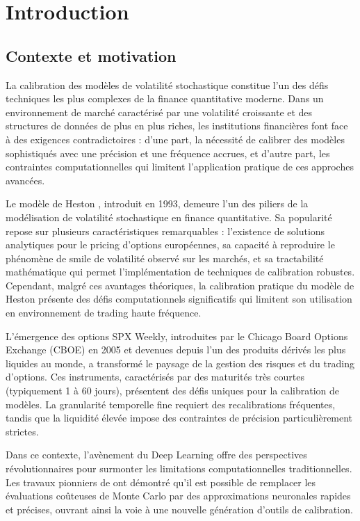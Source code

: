\chapter{Introduction}

\section{Contexte et motivation}

La calibration des modèles de volatilité stochastique constitue l'un des défis techniques les plus complexes de la finance quantitative moderne. Dans un environnement de marché caractérisé par une volatilité croissante et des structures de données de plus en plus riches, les institutions financières font face à des exigences contradictoires : d'une part, la nécessité de calibrer des modèles sophistiqués avec une précision et une fréquence accrues, et d'autre part, les contraintes computationnelles qui limitent l'application pratique de ces approches avancées.

Le modèle de Heston \citep{heston1993closed}, introduit en 1993, demeure l'un des piliers de la modélisation de volatilité stochastique en finance quantitative. Sa popularité repose sur plusieurs caractéristiques remarquables : l'existence de solutions analytiques pour le pricing d'options européennes, sa capacité à reproduire le phénomène de smile de volatilité observé sur les marchés, et sa tractabilité mathématique qui permet l'implémentation de techniques de calibration robustes. Cependant, malgré ces avantages théoriques, la calibration pratique du modèle de Heston présente des défis computationnels significatifs qui limitent son utilisation en environnement de trading haute fréquence.

L'émergence des options SPX Weekly, introduites par le Chicago Board Options Exchange (CBOE) en 2005 et devenues depuis l'un des produits dérivés les plus liquides au monde, a transformé le paysage de la gestion des risques et du trading d'options. Ces instruments, caractérisés par des maturités très courtes (typiquement 1 à 60 jours), présentent des défis uniques pour la calibration de modèles. La granularité temporelle fine requiert des recalibrations fréquentes, tandis que la liquidité élevée impose des contraintes de précision particulièrement strictes.

Dans ce contexte, l'avènement du Deep Learning offre des perspectives révolutionnaires pour surmonter les limitations computationnelles traditionnelles. Les travaux pionniers de \citet{bayer2018deep} ont démontré qu'il est possible de remplacer les évaluations coûteuses de Monte Carlo par des approximations neuronales rapides et précises, ouvrant ainsi la voie à une nouvelle génération d'outils de calibration.

